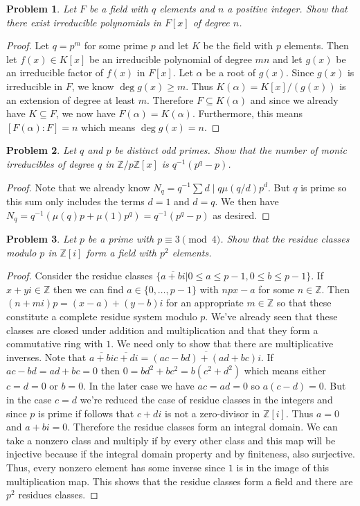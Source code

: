 \documentclass{article}
\newtheorem{problem}{Problem}
\begin{document}
\begin{problem}
Let $F$ be a field with $q$ elements and $n$ a positive integer. Show that there exist irreducible polynomials in $F[x]$ of degree $n$.
\end{problem}
\begin{proof}
Let $q=p^m$ for some prime $p$ and let $K$ be the field with $p$ elements. Then let $f(x) \in K[x]$ be an irreducible polynomial of degree $mn$ and let $g(x)$ be an irreducible factor of $f(x)$ in $F[x]$. Let $\alpha$ be a root of $g(x)$. Since $g(x)$ is irreducible in $F$, we know $\deg g(x) \geq m$. Thus $K(\alpha) = K[x]/(g(x))$ is an extension of degree at least $m$. Therefore $F \subseteq K(\alpha)$ and since we already have $K \subseteq F$, we now have $F(\alpha) = K(\alpha)$. Furthermore, this means $[F(\alpha):F] = n$ which means $\deg g(x) = n$.
\end{proof}

\begin{problem}
Let $q$ and $p$ be distinct odd primes. Show that the number of monic irreducibles of degree $q$ in $\mathbb{Z}/p\mathbb{Z}[x]$ is $q^{-1}(p^q-p)$.
\end{problem}
\begin{proof}
Note that we already know $N_q = q^{-1} \sum{d \mid q} \mu(q/d) p^d$. But $q$ is prime so this sum only includes the terms $d = 1$ and $d = q$. We then have $N_q = q^{-1}(\mu(q)p + \mu(1)p^q) = q^{-1}(p^q-p)$ as desired.
\end{proof}

\begin{problem}
Let $p$ be a prime with $p \equiv 3 \pmod{4}$. Show that the residue classes modulo $p$ in $\mathbb{Z}[i]$ form a field with $p^2$ elements.
\end{problem}
\begin{proof}
Consider the residue classes $\{\overline{a+bi} | 0 \leq a \leq p-1, 0 \leq b \leq p-1\}$. If $x+yi \in \mathbb{Z}$ then we can find $a \in \{0, \dots, p-1\}$ with $np x-a$ for some $n \in \mathbb{Z}$. Then $(n + mi)p = (x-a) + (y-b)i$ for an appropriate $m \in \mathbb{Z}$ so that these constitute a complete residue system modulo $p$. We've already seen that these classes are closed under addition and multiplication and that they form a commutative ring with $1$. We need only to show that there are multiplicative inverses. Note that $\overline{a+bi}\overline{c+di} = \overline{(ac-bd) + (ad+bc)i}$. If $ac-bd = ad+bc = 0$ then $0 = bd^2+bc^2 = b(c^2 + d^2)$ which means either $c = d = 0$ or $b = 0$. In the later case we have $ac = ad = 0$ so $a(c-d) = 0$. But in the case $c = d$ we're reduced the case of residue classes in the integers and since $p$ is prime if follows that $c+di$ is not a zero-divisor in $\mathbb{Z}[i]$. Thus $a = 0$ and $a+bi = 0$. Therefore the residue classes form an integral domain. We can take a nonzero class and multiply if by every other class and this map will be injective because if the integral domain property and by finiteness, also surjective. Thus, every nonzero element has some inverse since $1$ is in the image of this multiplication map. This shows that the residue classes form a field and there are $p^2$ residues classes.
\end{proof}
\end{document}
